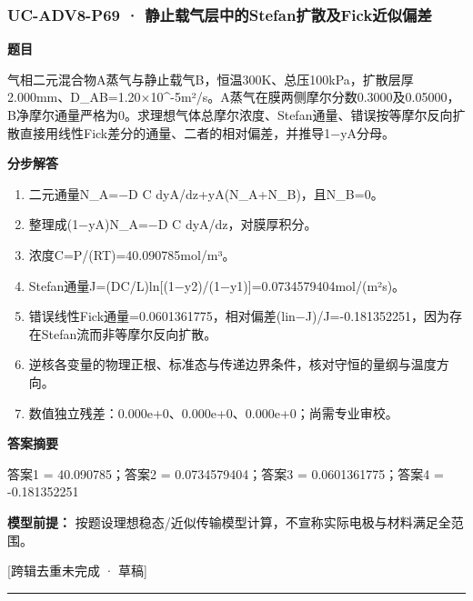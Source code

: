 \documentclass[UTF8,11pt,a4paper]{ctexart}
\begin{document}
\subsubsection*{UC-ADV8-P69 · 静止载气层中的Stefan扩散及Fick近似偏差}
\noindent\textbf{题目}\par
气相二元混合物A蒸气与静止载气B，恒温300K、总压100kPa，扩散层厚2.000mm、D\_AB=1.20×10\textasciicircum{}-5m²/s。A蒸气在膜两侧摩尔分数0.3000及0.05000，B净摩尔通量严格为0。求理想气体总摩尔浓度、Stefan通量、错误按等摩尔反向扩散直接用线性Fick差分的通量、二者的相对偏差，并推导1−yA分母。\par
\medskip\noindent\textbf{分步解答}
\begin{enumerate}
\item 二元通量N\_A=−D C dyA/dz+yA(N\_A+N\_B)，且N\_B=0。
\item 整理成(1−yA)N\_A=−D C dyA/dz，对膜厚积分。
\item 浓度C=P/(RT)=40.090785mol/m³。
\item Stefan通量J=(DC/L)ln[(1−y2)/(1−y1)]=0.0734579404mol/(m²s)。
\item 错误线性Fick通量=0.0601361775，相对偏差(lin−J)/J=-0.181352251，因为存在Stefan流而非等摩尔反向扩散。
\item 逆核各变量的物理正根、标准态与传递边界条件，核对守恒的量纲与温度方向。
\item 数值独立残差：0.000e+0、0.000e+0、0.000e+0；尚需专业审校。
\end{enumerate}
\noindent\textbf{答案摘要}\par
答案1 = 40.090785；答案2 = 0.0734579404；答案3 = 0.0601361775；答案4 = -0.181352251\par
\noindent\textbf{模型前提：}
按题设理想稳态/近似传输模型计算，不宣称实际电极与材料满足全范围。\par
\noindent\textcolor{red!65!black}{[跨辑去重未完成 · 草稿]} \par
\medskip\hrule\medskip
{}
\end{document}
